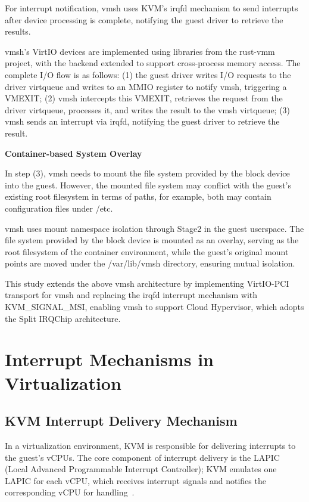 \begin{ZhChapter}
For interrupt notification, vmsh uses KVM's irqfd mechanism to send interrupts after device processing is complete, notifying the guest driver to retrieve the results.

vmsh's VirtIO devices are implemented using libraries from the rust-vmm project, with the backend extended to support cross-process memory access. The complete I/O flow is as follows: (1) the guest driver writes I/O requests to the driver virtqueue and writes to an MMIO register to notify vmsh, triggering a VMEXIT; (2) vmsh intercepts this VMEXIT, retrieves the request from the driver virtqueue, processes it, and writes the result to the vmsh virtqueue; (3) vmsh sends an interrupt via irqfd, notifying the guest driver to retrieve the result.

\noindent\textbf{Container-based System Overlay}

In step (3), vmsh needs to mount the file system provided by the block device into the guest. However, the mounted file system may conflict with the guest's existing root filesystem in terms of paths, for example, both may contain configuration files under /etc.

vmsh uses mount namespace isolation through Stage2 in the guest userspace. The file system provided by the block device is mounted as an overlay, serving as the root filesystem of the container environment, while the guest's original mount points are moved under the /var/lib/vmsh directory, ensuring mutual isolation.

This study extends the above vmsh architecture by implementing VirtIO-PCI transport for vmsh and replacing the irqfd interrupt mechanism with KVM\_SIGNAL\_MSI, enabling vmsh to support Cloud Hypervisor, which adopts the Split IRQChip architecture.

\section{Interrupt Mechanisms in Virtualization}
\label{sec:interrupt}

\subsection{KVM Interrupt Delivery Mechanism}
\label{sec:kvm-interrupt}

In a virtualization environment, KVM is responsible for delivering interrupts to the guest's vCPUs. The core component of interrupt delivery is the LAPIC (Local Advanced Programmable Interrupt Controller); KVM emulates one LAPIC for each vCPU, which receives interrupt signals and notifies the corresponding vCPU for handling~\cite{KVMAPI}.


\end{ZhChapter}
